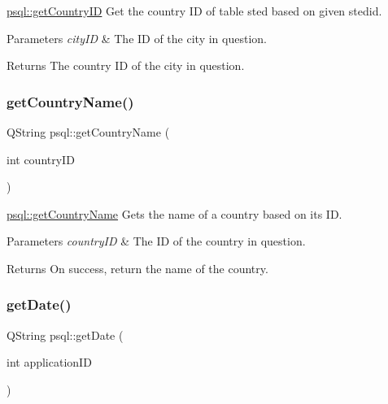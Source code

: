 \mbox{\hyperlink{classpsql_a81d02dc0350ba11d90257914078ba432}{psql\+::get\+Country\+ID}} Get the country ID of table sted based on given stedid. 


\begin{DoxyParams}{Parameters}
{\em city\+ID} & The ID of the city in question. \\
\hline
\end{DoxyParams}
\begin{DoxyReturn}{Returns}
The country ID of the city in question. 
\end{DoxyReturn}
\mbox{\label{classpsql_a5724e9992e6a5c98524ab73b98f4202d}} 
\subsubsection{\texorpdfstring{get\+Country\+Name()}{getCountryName()}}
{\footnotesize\ttfamily Q\+String psql\+::get\+Country\+Name (\begin{DoxyParamCaption}\item[{int}]{country\+ID }\end{DoxyParamCaption})}



\mbox{\hyperlink{classpsql_a5724e9992e6a5c98524ab73b98f4202d}{psql\+::get\+Country\+Name}} Gets the name of a country based on its ID. 


\begin{DoxyParams}{Parameters}
{\em country\+ID} & The ID of the country in question. \\
\hline
\end{DoxyParams}
\begin{DoxyReturn}{Returns}
On success, return the name of the country. 
\end{DoxyReturn}
\mbox{\label{classpsql_a561f96bfe7e9d092077712dd6b186af8}} 
\subsubsection{\texorpdfstring{get\+Date()}{getDate()}}
{\footnotesize\ttfamily Q\+String psql\+::get\+Date (\begin{DoxyParamCaption}\item[{int}]{application\+ID }\end{DoxyParamCaption})}



